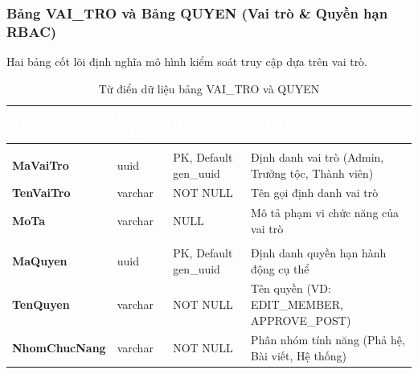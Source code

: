 \subsubsection{Bảng VAI\_TRO và Bảng QUYEN (Vai trò \& Quyền hạn RBAC)}
Hai bảng cốt lõi định nghĩa mô hình kiểm soát truy cập dựa trên vai trò.
\begin{table}[H]
\centering\small
\renewcommand{\arraystretch}{1.3}
\begin{tabularx}{\textwidth}{|>{\raggedright\arraybackslash\bfseries}p{3.2cm}|>{\raggedright\arraybackslash}p{2.3cm}|>{\raggedright\arraybackslash}p{3.2cm}|>{\raggedright\arraybackslash}X|}
\hline
\rowcolor{tableheader}
\textcolor{white}{\textbf{Tên thuộc tính}} & \textcolor{white}{\textbf{Kiểu vật lý}} & \textcolor{white}{\textbf{Ràng buộc}} & \textcolor{white}{\textbf{Ý nghĩa nghiệp vụ}} \\
\hline
\multicolumn{4}{|l|}{\cellcolor{softblue}\textbf{Bảng VAI\_TRO (Vai trò người dùng)}} \\
\hline
MaVaiTro & uuid & PK, Default gen\_uuid & Định danh vai trò (Admin, Trưởng tộc, Thành viên) \\
\hline
TenVaiTro & varchar & NOT NULL & Tên gọi định danh vai trò \\
\hline
MoTa & varchar & NULL & Mô tả phạm vi chức năng của vai trò \\
\hline
\multicolumn{4}{|l|}{\cellcolor{softblue}\textbf{Bảng QUYEN (Quyền hạn hành động)}} \\
\hline
MaQuyen & uuid & PK, Default gen\_uuid & Định danh quyền hạn hành động cụ thể \\
\hline
TenQuyen & varchar & NOT NULL & Tên quyền (VD: EDIT\_MEMBER, APPROVE\_POST) \\
\hline
NhomChucNang & varchar & NOT NULL & Phân nhóm tính năng (Phả hệ, Bài viết, Hệ thống) \\
\hline
\end{tabularx}
\caption{Từ điển dữ liệu bảng VAI\_TRO và QUYEN}
\label{tab:dict_vai_tro_quyen}
\end{table}

